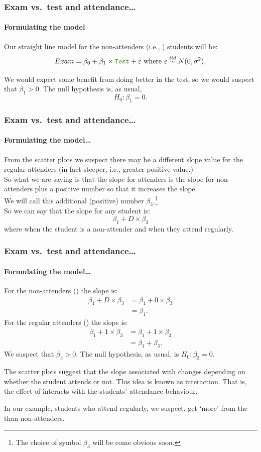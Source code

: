 \documentclass{beamer}\usepackage[]{graphicx}\usepackage[]{xcolor}
\begin{document}
\begin{frame}[fragile]
\frametitle{Exam vs.\ test \textbf{and} attendance\ldots}
\framesubtitle{Formulating the model}
Our straight line model for the non-attenders (i.e., ) students will be:\\
\bigskip
\[
Exam=\beta_0 + \beta_1\times \rcode{Test} + \varepsilon \mbox{ where } \varepsilon \iid N(0, \sigma^2).
\]
\bigskip

We would expect some benefit from doing better in the test, 
so we would suspect that $\beta_1>0$. The null hypothesis is, as usual, 
\[
H_0:\beta_1=0.
\]
\end{frame}


\begin{frame}[fragile]
\frametitle{Exam vs.\ test \textbf{and} attendance\ldots}
\framesubtitle{Formulating the model\ldots}
From the scatter plots we suspect there may be a different slope value for the regular attenders (in fact steeper, i.e., greater positive value.) \\
\bigskip
So what we are saying is that the slope for attenders is the slope for non-attenders plus a positive number so that it increases the slope.\\
\bigskip
We will call this additional (positive) number $\beta_3$.\footnote{ The choice of symbol $\beta_3$ will be come obvious soon.}\\
\bigskip
So we can say that the slope for any student is:
\[
\beta_1+D\times\beta_3
\]
where  when the student is a non-attender and   when they attend regularly.
\end{frame}


\begin{frame}[fragile]
\frametitle{Exam vs.\ test \textbf{and} attendance\ldots}
\framesubtitle{Formulating the model\ldots}
For the non-attenders () the slope is:
\begin{align*}
\beta_1 + D \times \beta_3 &=\beta_1+ 0 \times \beta_3\\
&=\beta_1.
\end{align*}
For the regular attenders () the slope is:
\begin{align*}
\beta_1+1\times\beta_3&=\beta_1+1\times\beta_3\\
&=\beta_1+\beta_3.
\end{align*}
We suspect that $\beta_3>0$.
The null hypothesis, as usual, is $H_0: \beta_3=0$.

The scatter plots suggest that the slope associated with  changes depending on whether the student attends or not. This idea is known as interaction. That is, the effect of  interacts with the students' attendance behaviour. 

\medskip
In our example, students who attend regularly, we suspect, get `more' from the  than  non-attenders.
\end{frame}
\end{document}
